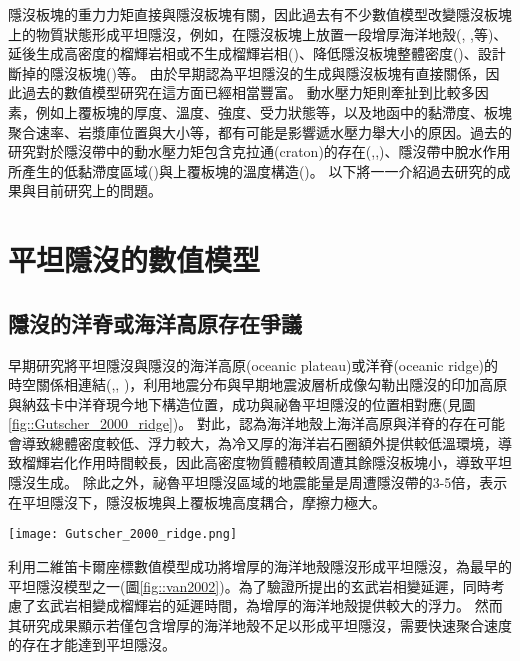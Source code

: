 隱沒板塊的重力力矩直接與隱沒板塊有關，因此過去有不少數值模型改變隱沒板塊上的物質狀態形成平坦隱沒，例如，在隱沒板塊上放置一段增厚海洋地殼(\citealp{van2002role}, \citealp{Liu2016},\citealp{Hu2016}等)、延後生成高密度的榴輝岩相或不生成榴輝岩相(\citealp{van2002role})、降低隱沒板塊整體密度(\citealp{Gerya2009})、設計斷掉的隱沒板塊(\citealp{Liu2016})等。
由於早期認為平坦隱沒的生成與隱沒板塊有直接關係，因此過去的數值模型研究在這方面已經相當豐富。
動水壓力矩則牽扯到比較多因素，例如上覆板塊的厚度、溫度、強度、受力狀態等，以及地函中的黏滯度、板塊聚合速率、岩漿庫位置與大小等，都有可能是影響遞水壓力舉大小的原因。過去的研究對於隱沒帶中的動水壓力矩包含克拉通(craton)的存在(\citealp{Manea2012Chile},\citealp{Liu2016},\citealp{Hu2016})、隱沒帶中脫水作用所產生的低黏滯度區域(\citealp{Manea2007})與上覆板塊的溫度構造(\citealp{Thermal2012})。
以下將一一介紹過去研究的成果與目前研究上的問題。

\section{平坦隱沒的數值模型}
\subsection{隱沒的洋脊或海洋高原存在爭議}
早期研究將平坦隱沒與隱沒的海洋高原(oceanic plateau)或洋脊(oceanic ridge)的時空關係相連結(\citealp{pilger1981plate},\citealp{henderson1984mesozoic}, \citealp{Gutscher2000A})，\citealp{Gutscher2000A}利用地震分布與早期地震波層析成像勾勒出隱沒的印加高原與納茲卡中洋脊現今地下構造位置，成功與祕魯平坦隱沒的位置相對應(見圖\ref{fig::Gutscher_2000_ridge})。
對此，\citealp{Gutscher2000A}認為海洋地殼上海洋高原與洋脊的存在可能會導致總體密度較低、浮力較大，為冷又厚的海洋岩石圈額外提供較低溫環境，導致榴輝岩化作用時間較長，因此高密度物質體積較周遭其餘隱沒板塊小，導致平坦隱沒生成。
除此之外，祕魯平坦隱沒區域的地震能量是周遭隱沒帶的3-5倍，表示在平坦隱沒下，隱沒板塊與上覆板塊高度耦合，摩擦力極大。
\begin{figure*}[ht!]
    \centering
    \texttt{[image: Gutscher\_2000\_ridge.png]}
    \caption{南美洲板塊構造圖，摘自\citealp{Gutscher2000A}。粗支架線標出平坦隱沒段，灰色陰影區標示隱沒的海洋高原與洋脊，三角形為活動火山。板塊聚合速率參考自\citealp{demets1990current}。
    }
    \label{fig::Gutscher_2000_ridge}
\end{figure*}

\citealp{van2002role}利用二維笛卡爾座標數值模型成功將增厚的海洋地殼隱沒形成平坦隱沒，為最早的平坦隱沒模型之一(圖\ref{fig::van2002})。為了驗證\citealp{Gutscher2000A}所提出的玄武岩相變延遲，\citealp{van2002role}同時考慮了玄武岩相變成榴輝岩的延遲時間，為增厚的海洋地殼提供較大的浮力。
然而其研究成果顯示若僅包含增厚的海洋地殼不足以形成平坦隱沒，需要快速聚合速度的存在才能達到平坦隱沒。

